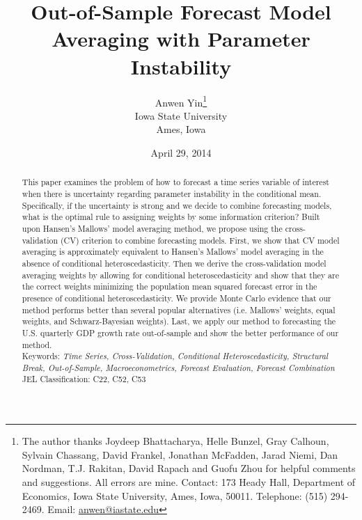 \newtheorem{theorem}{Theorem}[section]
\newtheorem{lemma}[theorem]{Lemma}
\newtheorem{proposition}[theorem]{Proposition}
\newtheorem{corollary}[theorem]{Corollary}
\newtheorem{Assumption}{Assumption}

\title{Out-of-Sample Forecast Model Averaging with Parameter Instability}
\author{Anwen Yin\thanks{The author thanks Joydeep Bhattacharya, Helle Bunzel, Gray Calhoun, Sylvain Chassang, David Frankel, Jonathan McFadden, Jarad Niemi, Dan Nordman, T.J. Rakitan, David Rapach and Guofu Zhou for helpful comments and suggestions. All errors are mine. Contact: 173 Heady Hall, Department of Economics, Iowa State University, Ames, Iowa, 50011. Telephone: (515) 294-2469. Email: \href{mailto:anwen@iastate.edu}{anwen@iastate.edu}} \\ Iowa State University\\Ames, Iowa}
\date{April 29, 2014}

\maketitle

\begin{abstract}
  \noindent This paper examines the problem of how to forecast a time series variable of interest when there is uncertainty regarding parameter instability in the conditional mean. Specifically, if the uncertainty is strong and we decide to combine forecasting models, what is the optimal rule to assigning weights by some information criterion? Built upon Hansen's Mallows' model averaging method, we propose using the cross-validation (CV) criterion to combine forecasting models. First, we show that CV model averaging is approximately equivalent to Hansen's Mallows' model averaging in the absence of conditional heteroscedasticity. Then we derive the cross-validation model averaging weights by allowing for conditional heteroscedasticity and show that they are the correct weights minimizing the population mean squared forecast error in the presence of conditional heteroscedasticity. We provide Monte Carlo evidence that our method performs better than several popular alternatives (i.e. Mallows' weights, equal weights, and Schwarz-Bayesian weights). Last, we apply our method to forecasting the U.S. quarterly GDP growth rate out-of-sample and show the better performance of our method.\\

  \noindent Keywords: \emph{Time Series, Cross-Validation, Conditional Heteroscedasticity, Structural Break, Out-of-Sample, Macroeconometrics, Forecast Evaluation, Forecast Combination}\\

  \noindent \textsc{JEL} Classification: C22, C52, C53
\end{abstract}
\newpage
\doublespacing
